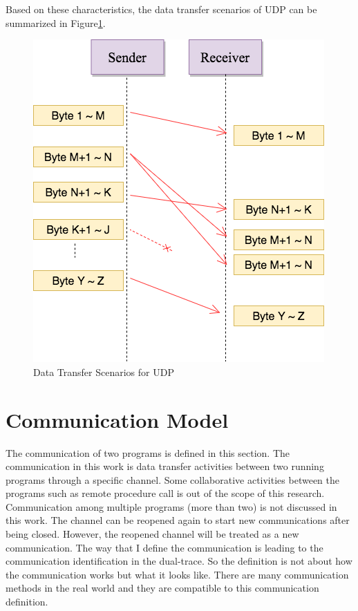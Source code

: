 Based on these characteristics, the data transfer scenarios of UDP can be summarized in Figure\ref{upd}.
\begin{figure}[H]
\centerline{\includegraphics[scale=0.48]{Figures/udp}}
 \caption{Data Transfer Scenarios for UDP}
\label{upd}
\end{figure}

\section{Communication Model}\label{definition}
The communication of two programs is defined in this section. The communication in this work is data transfer activities between two running programs through a specific channel. Some collaborative activities between the programs such as remote procedure call is out of the scope of this research. Communication among multiple programs (more than two) is not discussed in this work. The channel can be reopened again to start new communications after being closed. However, the reopened channel will be treated as a new communication. The way that I define the communication is leading to the communication identification in the dual-trace. So the definition is not about how the communication works but what it looks like. There are many communication methods in the real world and they are compatible to this communication definition. 

